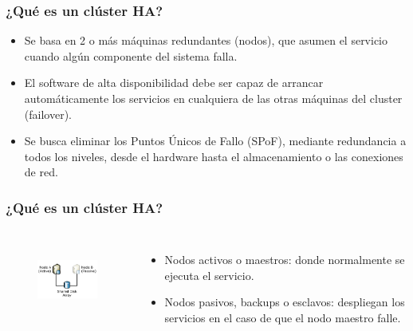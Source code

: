 \documentclass{beamer}
\begin{document}

\begin{frame}
\frametitle{¿Qué es un clúster HA?}

\begin{itemize}

\item Se basa en 2 o más máquinas redundantes (\alert{nodos}), que asumen el servicio cuando algún componente del sistema falla.
\item El software de alta disponibilidad debe ser capaz de arrancar automáticamente los servicios en cualquiera de las otras máquinas del cluster (\alert{failover}).
\item Se busca eliminar los \alert{Puntos Únicos de Fallo} (SPoF), mediante redundancia a todos los niveles, desde el hardware hasta el almacenamiento o las conexiones de red. 
\end{itemize}

\end{frame}



\begin{frame}
\frametitle{¿Qué es un clúster HA?}

\begin{columns}

\column[t]{4cm}

\begin{figure}[h]

\begin{center}
  \centering
  \includegraphics[height=1in]{figs/cluster.png}
\end{center}
\end{figure}


\column[t]{7.5cm}

\begin{itemize}
	\item \alert{Nodos activos} o \alert{maestros}: donde normalmente se ejecuta el servicio.
	\item \alert{Nodos pasivos}, \alert{backups} o \alert{esclavos}: despliegan los servicios en el caso de que el nodo maestro falle. 
\end{itemize}

\end{columns}


\end{frame}
\end{document}
